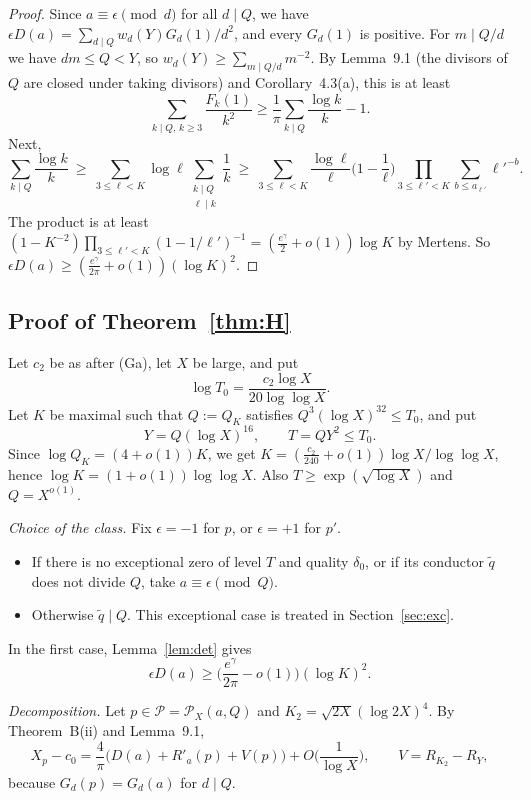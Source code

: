 \documentclass[11pt]{amsart}
\theoremstyle{remark}
\begin{document}
\begin{proof}
Since $a\equiv\epsilon\pmod d$ for all $d\mid Q$, we have $\epsilon D(a)=\sum_{d\mid Q}w_d(Y)G_d(1)/d^2$, and every $G_d(1)$ is positive. For $m\mid Q/d$ we have $dm\le Q<Y$, so $w_d(Y)\ge\sum_{m\mid Q/d}m^{-2}$. By Lemma~9.1 (the divisors of $Q$ are closed under taking divisors) and Corollary~4.3(a), this is at least
\[
\sum_{k\mid Q,\,k\ge3}\frac{F_k(1)}{k^2}\ge\frac1\pi\sum_{k\mid Q}\frac{\log k}k-1 .
\]
Next,
\[
\sum_{k\mid Q}\frac{\log k}k\ \ge\ \sum_{3\le\ell<K}\log\ell\sum_{\substack{k\mid Q\\ \ell\mid k}}\frac1k\ \ge\ \sum_{3\le\ell<K}\frac{\log\ell}{\ell}\Big(1-\frac1\ell\Big)\prod_{3\le\ell'<K}\sum_{b\le a_{\ell'}}\ell'^{-b}.
\]
The product is at least $(1-K^{-2})\prod_{3\le\ell'<K}(1-1/\ell')^{-1}=(\frac{e^\gamma}2+o(1))\log K$ by Mertens. So $\epsilon D(a)\ge(\frac{e^\gamma}{2\pi}+o(1))(\log K)^2$.
\end{proof}

\subsection{Proof of Theorem~\ref{thm:H}}\label{sec:Hproof}

Let $c_2$ be as after (Ga), let $X$ be large, and put
\[
\log T_0=\frac{c_2\log X}{20\log\log X}.
\]
Let $K$ be maximal such that $Q:=Q_K$ satisfies $Q^3(\log X)^{32}\le T_0$, and put
\[
Y=Q(\log X)^{16},\qquad T=QY^2\le T_0 .
\]
Since $\log Q_K=(4+o(1))K$, we get $K=(\frac{c_2}{240}+o(1))\log X/\log\log X$, hence $\log K=(1+o(1))\log\log X$. Also $T\ge\exp(\sqrt{\log X})$ and $Q=X^{o(1)}$.

\emph{Choice of the class.} Fix $\epsilon=-1$ for $p$, or $\epsilon=+1$ for $p'$.
\begin{itemize}
\item If there is no exceptional zero of level $T$ and quality $\delta_0$, or if its conductor $\tilde q$ does not divide $Q$, take $a\equiv\epsilon\pmod Q$.
\item Otherwise $\tilde q\mid Q$. This exceptional case is treated in Section~\ref{sec:exc}.
\end{itemize}
In the first case, Lemma~\ref{lem:det} gives
\[
\epsilon D(a)\ge\Big(\frac{e^\gamma}{2\pi}-o(1)\Big)(\log K)^2 .
\]

\emph{Decomposition.} Let $p\in\mathcal P=\mathcal P_X(a,Q)$ and $K_2=\sqrt{2X}(\log2X)^4$. By Theorem~B(ii) and Lemma~9.1,
\[
X_p-c_0=\frac4\pi\Big(D(a)+R'_a(p)+V(p)\Big)+O\Big(\frac1{\log X}\Big),\qquad V=R_{K_2}-R_Y ,
\]
because $G_d(p)=G_d(a)$ for $d\mid Q$.
\end{document}
